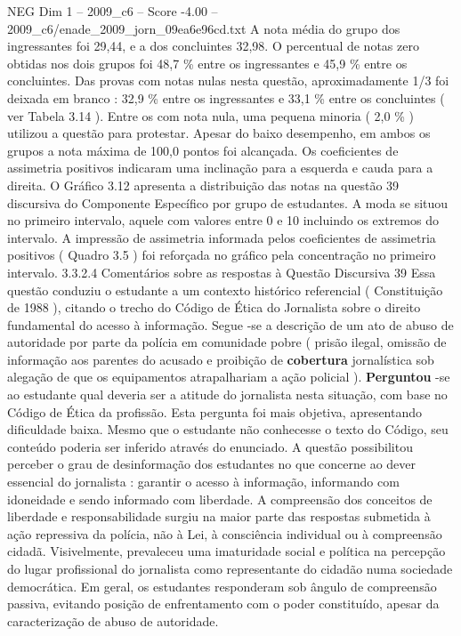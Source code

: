 \begin{textsample}{NEG Dim 1 – 2009\_c6 – Score -4.00 – 2009\_c6/enade\_2009\_jorn\_09ea6e96cd.txt}
A nota média do grupo dos ingressantes foi 29,44, e a dos concluintes 32,98.
O percentual de notas zero obtidas nos dois grupos foi 48,7 \% entre os ingressantes e 45,9 \% entre os concluintes.
Das provas com notas nulas nesta questão, aproximadamente 1/3 foi deixada em branco : 32,9 \% entre os ingressantes e 33,1 \% entre os concluintes ( ver Tabela 3.14 ).
Entre os com nota nula, uma pequena minoria ( 2,0 \% ) utilizou a questão para protestar.
Apesar do baixo desempenho, em ambos os grupos a nota máxima de 100,0 pontos foi alcançada.
Os coeficientes de assimetria positivos indicaram uma inclinação para a esquerda e cauda para a direita.
O Gráfico 3.12 apresenta a distribuição das notas na questão 39 discursiva do Componente Específico por grupo de estudantes.
A moda se situou no primeiro intervalo, aquele com valores entre 0 e 10 incluindo os extremos do intervalo.
A impressão de assimetria informada pelos coeficientes de assimetria positivos ( Quadro 3.5 ) foi reforçada no gráfico pela concentração no primeiro intervalo. 3.3.2.4 Comentários sobre as respostas à Questão Discursiva 39 Essa questão conduziu o estudante a um contexto histórico referencial ( Constituição de 1988 ), citando o trecho do Código de Ética do Jornalista sobre o direito fundamental do acesso à informação.
Segue -se a descrição de um ato de abuso de autoridade por parte da polícia em comunidade pobre ( prisão ilegal, omissão de informação aos parentes do acusado e proibição de \textbf{cobertura} jornalística sob alegação de que os equipamentos atrapalhariam a ação policial ). \textbf{Perguntou} -se ao estudante qual deveria ser a atitude do jornalista nesta situação, com base no Código de Ética da profissão.
Esta pergunta foi mais objetiva, apresentando dificuldade baixa.
Mesmo que o estudante não conhecesse o texto do Código, seu conteúdo poderia ser inferido através do enunciado.
A questão possibilitou perceber o grau de desinformação dos estudantes no que concerne ao dever essencial do jornalista : garantir o acesso à informação, informando com idoneidade e sendo informado com liberdade.
A compreensão dos conceitos de liberdade e responsabilidade surgiu na maior parte das respostas submetida à ação repressiva da polícia, não à Lei, à consciência individual ou à compreensão cidadã.
Visivelmente, prevaleceu uma imaturidade social e política na percepção do lugar profissional do jornalista como representante do cidadão numa sociedade democrática.
Em geral, os estudantes responderam sob ângulo de compreensão passiva, evitando posição de enfrentamento com o poder constituído, apesar da caracterização de abuso de autoridade.

\end{textsample}
